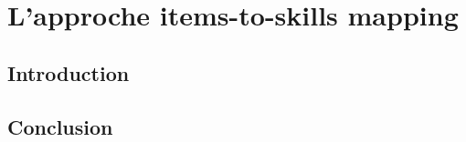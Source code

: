 \chapter{L'approche items-to-skills mapping} 
\minitoc
\thispagestyle{empty}
\newpage
\section{Introduction}

\section{Conclusion} 
